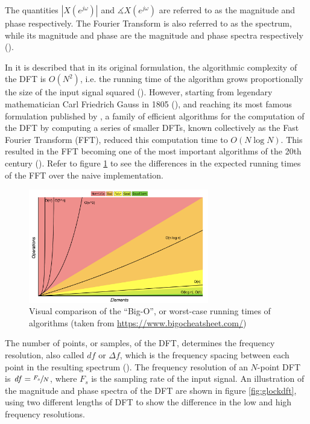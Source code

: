 \documentclass[report.tex]{subfiles}
\begin{document}
The quantities $|X(e^{j\omega})|$ and $\measuredangle X(e^{j\omega})$ are referred to as the magnitude and phase respectively. The Fourier Transform is also referred to as the spectrum, while its magnitude and phase are the magnitude and phase spectra respectively (\cite{discretebook}).

In \textcite[Chapter~9]{discretebook} it is described that in its original formulation, the algorithmic complexity of the DFT is $O(N^{2})$, i.e. the running time of the algorithm grows proportionally the size of the input signal squared (\cite{skiena}). However, starting from legendary mathematician Carl Friedrich Gauss in 1805 (\cite{gausshist}), and reaching its most famous formulation published by \textcite{cooleytukey}, a family of efficient algorithms for the computation of the DFT by computing a series of smaller DFTs, known collectively as the Fast Fourier Transform (FFT), reduced this computation time to $O(N \log{N})$. This resulted in the FFT becoming one of the most important algorithms of the 20th century (\cite{ffttopten, fiftyyears}). Refer to figure \ref{fig:bigo} to see the differences in the expected running times of the FFT over the naive implementation.

\begin{figure}[ht]
	\centering
	\includegraphics[width=0.7\textwidth]{./images-misc/bigo.png}
	\caption{Visual comparison of the ``Big-O'', or worst-case running times of algorithms (taken from \url{https://www.bigocheatsheet.com/})}
	\label{fig:bigo}
\end{figure}

The number of points, or samples, of the DFT, determines the frequency resolution, also called $\mathit{df}$ or $\mathit{\Delta f}$, which is the frequency spacing between each point in the resulting spectrum (\cite{discretebook}). The frequency resolution of an $N$-point DFT is $\mathit{df} = \sfrac{F_{s}}{N}$, where $F_{s}$ is the sampling rate of the input signal. An illustration of the magnitude and phase spectra of the DFT are shown in figure \ref{fig:glockdft}, using two different lengths of DFT to show the difference in the low and high frequency resolutions.
\end{document}
